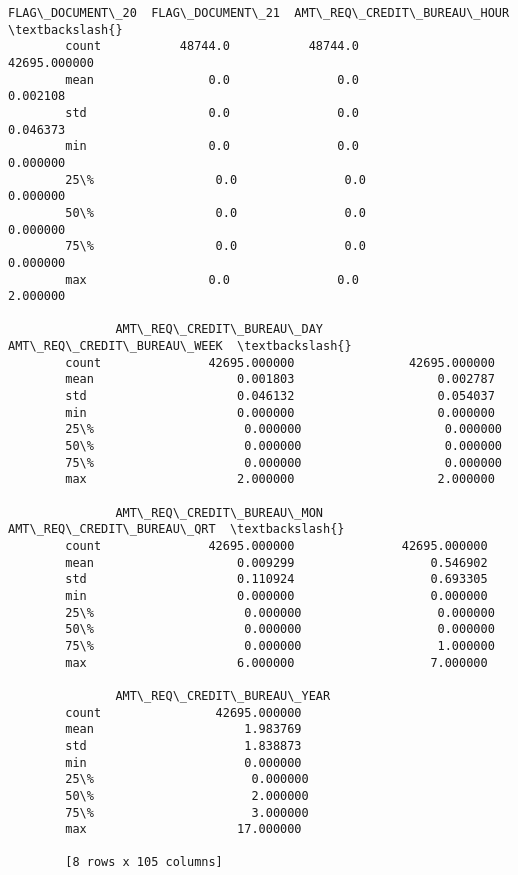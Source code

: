 \documentclass[11pt]{article}
\begin{document}
\begin{Verbatim}[commandchars=\\\{\}]
               FLAG\_DOCUMENT\_20  FLAG\_DOCUMENT\_21  AMT\_REQ\_CREDIT\_BUREAU\_HOUR  \textbackslash{}
        count           48744.0           48744.0                42695.000000   
        mean                0.0               0.0                    0.002108   
        std                 0.0               0.0                    0.046373   
        min                 0.0               0.0                    0.000000   
        25\%                 0.0               0.0                    0.000000   
        50\%                 0.0               0.0                    0.000000   
        75\%                 0.0               0.0                    0.000000   
        max                 0.0               0.0                    2.000000   
        
               AMT\_REQ\_CREDIT\_BUREAU\_DAY  AMT\_REQ\_CREDIT\_BUREAU\_WEEK  \textbackslash{}
        count               42695.000000                42695.000000   
        mean                    0.001803                    0.002787   
        std                     0.046132                    0.054037   
        min                     0.000000                    0.000000   
        25\%                     0.000000                    0.000000   
        50\%                     0.000000                    0.000000   
        75\%                     0.000000                    0.000000   
        max                     2.000000                    2.000000   
        
               AMT\_REQ\_CREDIT\_BUREAU\_MON  AMT\_REQ\_CREDIT\_BUREAU\_QRT  \textbackslash{}
        count               42695.000000               42695.000000   
        mean                    0.009299                   0.546902   
        std                     0.110924                   0.693305   
        min                     0.000000                   0.000000   
        25\%                     0.000000                   0.000000   
        50\%                     0.000000                   0.000000   
        75\%                     0.000000                   1.000000   
        max                     6.000000                   7.000000   
        
               AMT\_REQ\_CREDIT\_BUREAU\_YEAR  
        count                42695.000000  
        mean                     1.983769  
        std                      1.838873  
        min                      0.000000  
        25\%                      0.000000  
        50\%                      2.000000  
        75\%                      3.000000  
        max                     17.000000  
        
        [8 rows x 105 columns]
\end{Verbatim}
            
\end{document}
